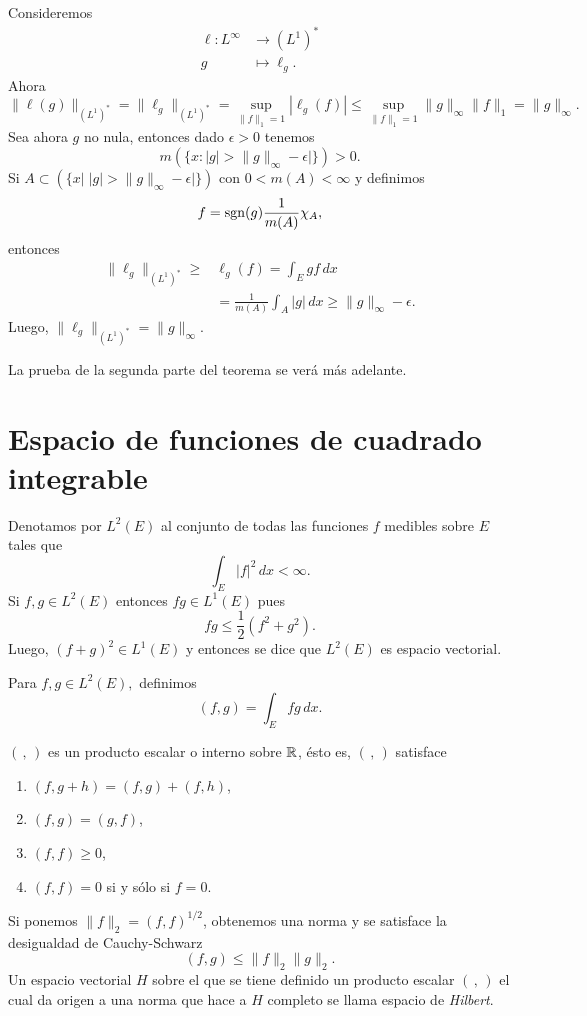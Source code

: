 \begin{demo}
Consideremos
\[
\begin{split}
\ell:L^{\infty}  & \longrightarrow (L^1)^*
\\
g & \longmapsto \ell_g.
\end{split}
\]
Ahora 
\[
\|\ell(g)\|_{(L^1)^*}=\|\ell_g\|_{(L^1)^*}=
\sup\limits_{\|f\|_1 =1} |\ell_g(f)| \leq 
\sup \limits_{\|f\|_1=1} \|g\|_{\infty} \|f\|_1 =\|g\|_{\infty}.
\]
Sea ahora $g$ no nula, entonces dado $\epsilon>0$ tenemos
\[
m\left(\{x: |g|>\|g\|_{\infty}-\epsilon|  \}\right)>0.
\]
Si $A \subset \left(\{x \big|\; |g|>\|g\|_{\infty}-\epsilon|  \}\right)$
con $0<m(A)<\infty$ y definimos 
\[
f=\operatorname{sgn}(g) \frac{1}{m(A)} \chi_A,
\]
entonces
\[
\begin{split}
    \|\ell_g\|_{(L^1)^*} \geq& \ell_g(f)=\int_E gf\,dx 
    \\
    &= \frac{1}{m(A)} \int_A |g|\,dx\geq \|g\|_{\infty}-\epsilon.
\end{split}
\]
Luego, $\|\ell_g\|_{(L^1)^*}=\|g\|_{\infty}$.

La prueba de la segunda parte del teorema se ver\'a m\'as adelante.
\end{demo}

\section{Espacio de funciones de cuadrado integrable}

Denotamos por $L^2(E)$ al conjunto de todas las funciones $f$ medibles sobre $E$ tales que 
\[ 
\int_E |f|^2\,dx <\infty.
\]
Si $f,g \in L^2(E)$ entonces $fg \in  L^1(E)$ pues
\[
fg \leq \frac{1}{2}\left(f^2+g^2\right).
\]
Luego, $(f+g)^2 \in L^1(E)$ y entonces se dice que $L^2(E)$ es espacio vectorial. 

Para $f,g\in L^2(E),$ definimos 
\[
(f,g)=\int_E fg\,dx.
\]

$(\, ,\, )$ es un producto escalar o interno sobre $\mathbb{R}$, \'esto es, 
$(\, ,\, )$ satisface
\begin{enumerate}
    \item $(f,g+h)=(f,g)+(f,h)$,
    \item $(f,g)=(g,f)$,
    \item $(f,f)\geq 0$,
    \item $(f,f)=0$ si y s\'olo si $f=0$.
\end{enumerate}

Si ponemos $\|f\|_2=(f,f)^{1/2}$, obtenemos una norma y se satisface la desigualdad de Cauchy-Schwarz
\[
(f,g)\leq \| f \|_2\|g\|_2.
\]
Un espacio vectorial $H$ sobre el que se tiene definido un producto escalar $(\, ,\, )$ el cual da origen a una norma que hace a $H$ completo se llama espacio de \emph{Hilbert}.

